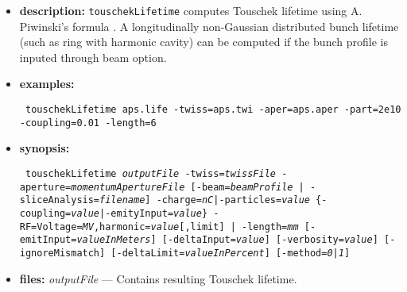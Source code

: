 \documentclass[11pt]{article}
\begin{document}
\begin{itemize}

\item {\bf description:} \verb|touschekLifetime| computes Touschek
  lifetime using A. Piwinski's formula \cite{Piwinski, Xiao2007a}. A
  longitudinally non-Gaussian distributed bunch lifetime (such as ring
  with harmonic cavity) can be computed if the bunch profile is
  inputed through beam option.

\item {\bf examples:}
\begin{flushleft}{\tt
touschekLifetime aps.life -twiss=aps.twi -aper=aps.aper -part=2e10 -coupling=0.01 -length=6
}\end{flushleft}

\item {\bf synopsis:}
\begin{flushleft}{\tt 
touschekLifetime {\em outputFile}
 -twiss={\em twissFile} -aperture={\em momentumApertureFile} [-beam={\em beamProfile} | -sliceAnalysis={\em filename}] 
 {-charge={\em nC}|-particles={\em value}} \{-coupling={\em value}|-emityInput={\em value}\}
 {-RF=Voltage={\em MV},harmonic={\em value}[,limit] | -length={\em mm}} 
 [-emitInput={\em valueInMeters}] [-deltaInput={\em value}] [-verbosity={\em value}]
 [-ignoreMismatch] [-deltaLimit={\em valueInPercent}] [-method={\em 0|1}]
}\end{flushleft}

\item {\bf files:}
{\em outputFile} --- Contains resulting Touschek lifetime.


\end{itemize}
\end{document}
